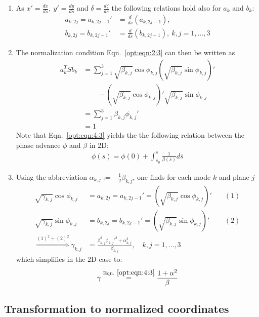 \begin{enumerate}
\item As $x'=\frac{dx}{ds},\ y'=\frac{dy}{ds}$ and $\delta=\frac{d\zeta}{ds}$ the following relations hold also for $a_k$ and $b_k$:
\begin{align}
a_{k,2j}=a_{k,2j-1}'&=\frac{d}{ds}(a_{k,2j-1}), \\
b_{k,2j}=b_{k,2j-1}'&=\frac{d}{ds}(b_{k,2j-1}),\ k,j=1,\ldots,3 
\end{align}
\item The normalization condition Eqn.~\ref{opt:eqn:2:3} can then be written as
\begin{align}
a_k^TSb_k&=\sum_{j=1}^3\sqrt{\beta_{k,j}}\cos{\phi_{k,j}}\left(\sqrt{\beta_{k,j}}\sin{\phi_{k,j}}\right)'\nonumber\\
& \qquad -\left(\sqrt{\beta_{k,j}}\cos{\phi_{k,j}}\right)'\sqrt{\beta_{k,j}}\sin{\phi_{k,j}}\nonumber\\
&=\sum_{j=1}^3\beta_{k,j}\phi_{k,j}'\nonumber\\
&=1 \label{opt:eqn:4:3}
\end{align}
Note that Eqn.~\ref{opt:eqn:4:3} yields the the following relation between the phase advance $\phi$ and $\beta$ in 2D:
\begin{align}
\phi(s)=\phi(0)+\int_{s_0}^s\frac{1}{\beta(\bar s)}d\bar s
\end{align}
\item Using the abbreviation $\alpha_{k,j}:=-\frac{1}{2}\beta_{k,j}$, one finds for each mode $k$ and plane $j$
\begin{align}
\sqrt{\gamma_{k,j}}\cos{\phi_{k,j}}&=a_{k,2j}=a_{k,2j-1}'=(\sqrt{\beta_{k,j}}\cos{\phi_{k,j}})' &\quad (1)\nonumber\\
\sqrt{\gamma_{k,j}}\sin{\phi_{k,j}}&=b_{k,2j}=b_{k,2j-1}'=(\sqrt{\beta_{k,j}}\sin{\phi_{k,j}})' &\quad (2)\nonumber\\
\overset{(1)^2+(2)^2}{\Rightarrow} \gamma_{k,j}&=\frac{\beta_{k,j}^2\phi_{k,j}'^2+\alpha_{k,j}^2}{\beta_{k,j}}, \quad k,j=1,\ldots,3 &
\end{align}
which simplifies in the 2D case to:
\begin{align}
\gamma\overset{\rm Eqn.~\ref{opt:eqn:4:3}}{=}\frac{1+\alpha^2}{\beta}
\end{align}
\end{enumerate}

\subsection{Transformation to normalized coordinates}

